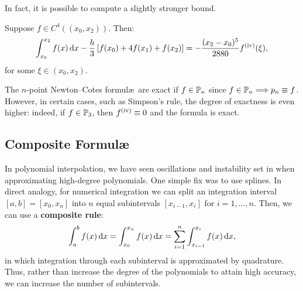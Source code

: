 In fact, it is possible to compute a slightly stronger bound.
\begin{theorem}
Suppose $f\in C^4((x_0,x_2))$. Then:
\[
\int_{x_0}^{x_2}f(x)\ud x - \dfrac{h}{3}\br[f(x_0)+4f(x_1)+f(x_2)] = -\dfrac{(x_2-x_0)^5}{2880}f^{({\rm iv})}(\xi),
\]
for some $\xi\in(x_0,x_2)$.
\end{theorem}

\begin{remark}
The $n$-point Newton--Cotes formul\ae~are exact if $f\in\P_n$ since $f\in\P_n\Longrightarrow p_n \equiv f$. However, in certain cases, such as Simpson's rule, the degree of exactness is even higher: indeed, if $f\in\P_3$, then $f^{({\rm iv})}\equiv0$ and the formula is exact.
\end{remark}

\subsection{Composite Formul\ae}

In polynomial interpolation, we have seen oscillations and instability set in when approximating high-degree polynomials. One simple fix was to use splines. In direct analogy, for numerical integration we can split an integration interval $[a,b] = [x_0,x_n]$ into $n$ equal subintervals $[x_{i-1},x_i]$ for $i=1,\ldots,n$. Then, we can use a {\bf composite rule}:
\[
\int_a^bf(x)\ud x = \int_{x_0}^{x_n}f(x)\ud x = \sum_{i=1}^n\int_{x_{i-1}}^{x_i}f(x)\ud x,
\]
in which integration through each subinterval is approximated by quadrature. Thus, rather than increase the degree of the polynomials to attain high accuracy, we can increase the number of subintervals.


